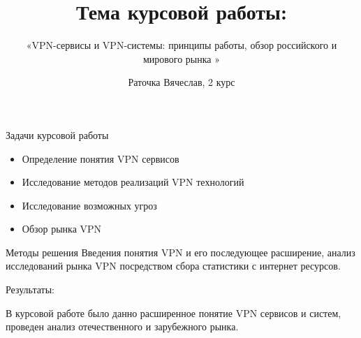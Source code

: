 \documentclass[11pt]{beamer}
\title{Тема курсовой работы:}
\subtitle{«VPN-сервисы и VPN-системы: принципы работы, обзор российского и мирового рынка »}
\author{Раточка Вячеслав, 2 курс}
\institute{Балтийский федеральный университет имени Иммануила Канта}
\begin{document}
	
	\begin{frame}
		\titlepage
	\end{frame}
	
	\begin{frame}
		\begin{block}{Задачи курсовой работы}
			\begin{itemize}
				\item Определение понятия VPN сервисов
				\item Исследование методов реализаций VPN технологий
				\item Исследование возможных угроз
				\item Обзор рынка VPN 
				\end{itemize}
		\end{block}

			\begin{block}{Методы решения}
				Введения понятия VPN и его последующее расширение, анализ исследований рынка VPN посредством сбора статистики с интернет ресурсов.
						\end{block}
	\end{frame}

	\begin{frame}
Результаты:
			
				В курсовой работе было данно расширенное понятие VPN сервисов и систем, проведен анализ отечественного и зарубежного рынка. 

\end{frame}	
\end{document}
